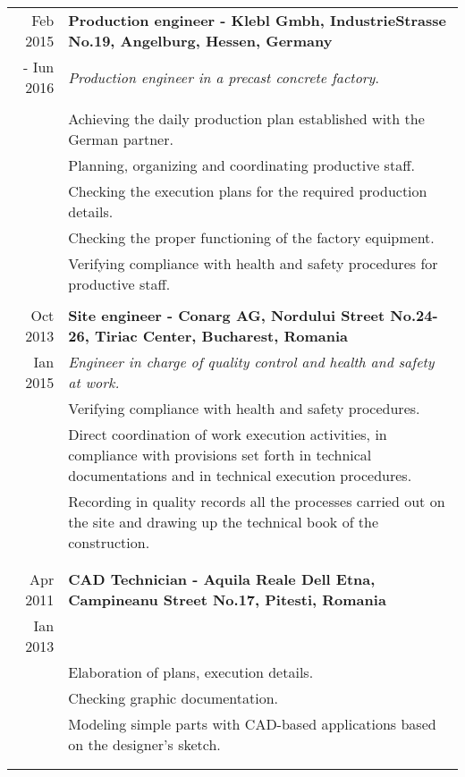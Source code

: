 \documentclass[a4paper,10pt]{article} %
\begin{document}
\begin{tabular}{r|p{15cm}}
Feb 2015 & \large\textbf{Production engineer - Klebl Gmbh, IndustrieStrasse No.19, Angelburg, Hessen, Germany} \\
- Iun 2016 & \emph{Production engineer in a precast concrete factory}.\\ 
& \\
& Achieving the daily production plan established with the German partner.\\
& Planning, organizing and coordinating productive staff.\\
& Checking the execution plans for the required production details.\\
& Checking the proper functioning of the factory equipment.\\
& Verifying compliance with health and safety procedures for productive staff.\\
\multicolumn{2}{c}{} \\


Oct 2013 & \large\textbf{Site engineer - Conarg AG, Nordului Street No.24-26, Tiriac Center, Bucharest, Romania}\\
Ian 2015 & \emph{Engineer in charge of quality control and health and safety at work.}\\
& Verifying compliance with health and safety procedures.\\
& Direct coordination of work execution activities, in compliance with provisions set forth in technical documentations and in technical execution procedures.\\
& Recording in quality records all the processes carried out on the site and drawing up the technical book of the construction.\\
& \\
\multicolumn{2}{c}{} \\


Apr 2011 & \large\textbf{CAD Technician - Aquila Reale Dell Etna, Campineanu Street No.17, Pitesti, Romania}\\
Ian 2013 & \emph{}\\
& Elaboration of plans, execution details.\\
& Checking graphic documentation.\\
& Modeling simple parts with CAD-based applications based on the designer's sketch.\\
& \\

\multicolumn{2}{c}{} \\

\end{tabular}
\end{document}
